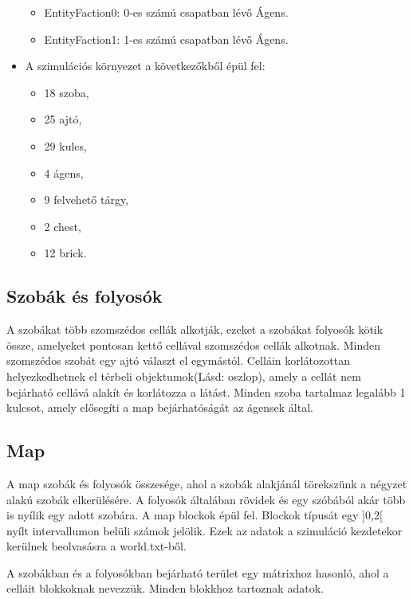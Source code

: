 \begin{itemize}
    \begin{itemize}
        \item EntityFaction0: 0-es számú csapatban lévő Ágens.
        \item EntityFaction1: 1-es számú csapatban lévő Ágens.
    \end{itemize}
    
    \item A szimulációs környezet a következőkből épül fel:
    
    \begin{itemize}
        \item 18 szoba, 
        \item 25 ajtó,
        \item 29 kulcs,
        \item 4 ágens,
        \item 9 felvehető tárgy,
        \item 2 chest,
        \item 12 brick.
    \end{itemize}

\end{itemize}

\subsection{Szobák és folyosók}

A szobákat több szomszédos cellák alkotják, ezeket a szobákat folyosók kötik össze, amelyeket pontosan kettő cellával szomszédos cellák alkotnak.
Minden szomszédos szobát egy ajtó választ el egymástól.
Celláin korlátozottan helyezkedhetnek el térbeli objektumok(Lásd: oszlop), amely a cellát nem bejárható cellává alakít és korlátozza a látást.
Minden szoba tartalmaz legalább 1 kulcsot, amely elősegíti a map bejárhatóságát az ágensek által.

\subsection{Map}

A map szobák és folyosók összesége, ahol a szobák alakjánál törekszünk a négyzet alakú szobák elkerülésére. A folyosók általában rövidek és egy szóbából akár több is nyílik egy adott szobára.
A map blockok épül fel. Blockok típusát egy ]0,2[ nyílt intervallumon belüli számok jelölik.
Ezek az adatok a szimuláció kezdetekor kerülnek beolvasásra a world.txt-ből.

A szobákban és a folyosókban bejárható terület egy mátrixhoz hasonló, ahol a celláit blokkoknak nevezzük.
Minden blokkhoz tartoznak adatok.

